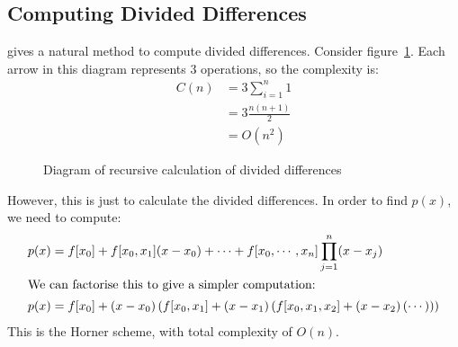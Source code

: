 \documentclass[../Main.tex]{subfiles}
\begin{document}
\subsection{Computing Divided Differences}
 gives a natural method to compute divided differences. Consider figure~\ref{figDivDiff}. Each arrow in this diagram represents 3 operations, so the complexity is:
\begin{align*}
    C(n) &= 3\sum_{i=1}^{n} 1 \\
    &= 3 \frac{n(n+1)}{2} \\
    &= O(n^2)
\end{align*}
\begin{figure}
    \centering
    \caption{Diagram of recursive calculation of divided differences}
    \label{figDivDiff}
\end{figure}
However, this is just to calculate the divided differences. In order to find $p(x)$, we need to compute:
\begin{align*}
    p(x) &= f[x_0] + f[x_0, x_1] (x - x_0) + \cdots + f[x_0, \cdots, x_n] \prod_{j=1}^{n} (x - x_j) \\
    \intertext{We can factorise this to give a simpler computation:}
    p(x) &= f[x_0] + (x - x_0) \left(f[x_0, x_1] + (x - x_1) \left(f[x_0, x_1, x_2] + (x - x_2)\left(\cdots\right)\right)\right)
\end{align*}
This is the Horner scheme, with total complexity of $O(n)$.
\end{document}
